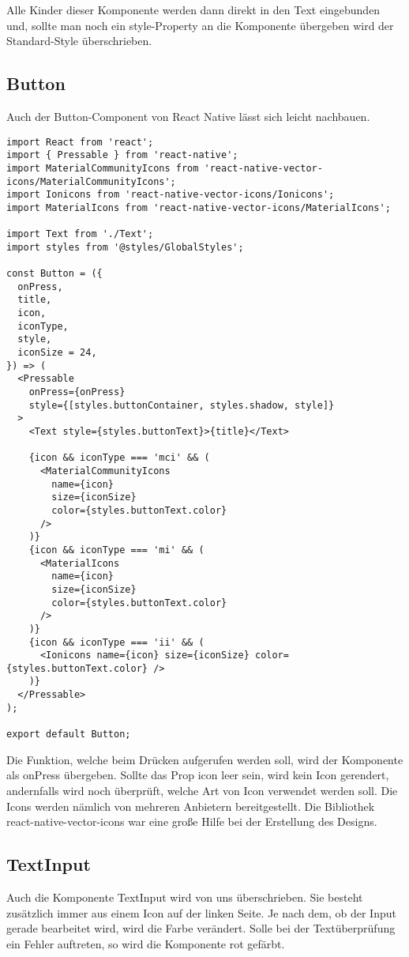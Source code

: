 Alle Kinder dieser Komponente werden dann direkt in den Text eingebunden und, sollte man noch ein
style-Property an die Komponente übergeben wird der Standard-Style überschrieben.

\newpage
\subsection{Button}
Auch der Button-Component von React Native lässt sich leicht nachbauen.

\begin{lstlisting}
import React from 'react';
import { Pressable } from 'react-native';
import MaterialCommunityIcons from 'react-native-vector-icons/MaterialCommunityIcons';
import Ionicons from 'react-native-vector-icons/Ionicons';
import MaterialIcons from 'react-native-vector-icons/MaterialIcons';

import Text from './Text';
import styles from '@styles/GlobalStyles';

const Button = ({
  onPress,
  title,
  icon,
  iconType,
  style,
  iconSize = 24,
}) => (
  <Pressable
    onPress={onPress}
    style={[styles.buttonContainer, styles.shadow, style]}
  >
    <Text style={styles.buttonText}>{title}</Text>

    {icon && iconType === 'mci' && (
      <MaterialCommunityIcons
        name={icon}
        size={iconSize}
        color={styles.buttonText.color}
      />
    )}
    {icon && iconType === 'mi' && (
      <MaterialIcons
        name={icon}
        size={iconSize}
        color={styles.buttonText.color}
      />
    )}
    {icon && iconType === 'ii' && (
      <Ionicons name={icon} size={iconSize} color={styles.buttonText.color} />
    )}
  </Pressable>
);

export default Button;
\end{lstlisting}

Die Funktion, welche beim Drücken aufgerufen werden soll, wird der Komponente als onPress übergeben.
Sollte das Prop icon leer sein, wird kein Icon gerendert, andernfalls wird noch überprüft, welche
Art von Icon verwendet werden soll. Die Icons werden nämlich von mehreren Anbietern bereitgestellt.
Die Bibliothek react-native-vector-icons war eine große Hilfe bei der Erstellung des Designs.

\newpage
\subsection{TextInput}
Auch die Komponente TextInput wird von uns überschrieben. Sie besteht zusätzlich immer aus einem
Icon auf der linken Seite. Je nach dem, ob der Input gerade bearbeitet wird, wird die Farbe
verändert. Solle bei der Textüberprüfung ein Fehler auftreten, so wird die Komponente rot gefärbt.

